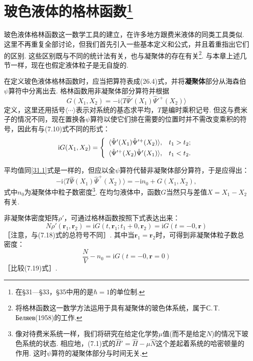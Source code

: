 \section[玻色液体的格林函数]{玻色液体的格林函数\footnote{在§31—§33，§35中用的是$\hbar=1$的单位制.}}

玻色液体格林函数这一数学工具的建立，在许多地方跟费米液体的同类工具类似. 这里不再重复全部讨论，但我们首先引入一些基本定义和公式，并且着重指出它们的区别. 这些区别既与不同的统计法有关，也与凝聚体的存在有关\footnote{将格林函数这一数学方法运用于具有凝聚体的玻色体系统，属于С.\,Т.\,Беляев(1958)的工作.}. 与本章上述几节一样，现在也假定液体粒子是无自旋的.

在定义玻色液体格林函数时，应当把算符表成(26.4)式，并将\textbf{凝聚体}部分从海森伯$\psi$算符中分离出去. 格林函数用非凝聚体部分算符并根据
\begin{equation}
G(X_{1},X_{2})=-\mathrm{i}\langle T\hat{\Psi}'(X_{1})\hat{\Psi}'^{+}(X_{2})\rangle
\label{31.1}
\end{equation}
定义，这里还用括号$\langle\cdots\rangle$表示对系统的基态求平均，$T$是编时乘积记号. 但这与费米子的情况不同，现在置换各$\psi$算符以使它们排在需要的位置时并不需改变乘积的符号，因此有与(7.10)式不同的形式：
\begin{equation}
\mathrm{i}G(X_{1},X_{2})=
\left\{\begin{array}{l l}
\langle\hat{\Psi}'(X_{1})\hat{\Psi}'^{+}(X_{2})\rangle, & t_{1}>t_{2};\\[0.3em]
\langle\hat{\Psi}'^{+}(X_{2})\hat{\Psi}'(X_{1})\rangle, & t_{1}<t_{2}.
\end{array}\right.
\label{31.2}
\end{equation}

平均值同\eqref{31.1}式是一样的，但应以全$\psi$算符代替非凝聚体部分算符，于是应得出：
\begin{equation}
-\mathrm{i}\langle T\hat{\Psi}(X_{1})\hat{\Psi}^{+}(X_{2})\rangle
=-\mathrm{i}n_{0}+G(X_{1},X_{2}),
\label{31.3}
\end{equation}
式中$n_{0}$为凝聚体中粒子数密度\footnote{像对待费米系统一样，我们将研究在给定化学势$\mu$值(而不是给定$N$)的情况下玻色系统的状态. 相应地，(7.1)式的$\hat{H}'=\hat{H}-\mu\hat{N}$这个差起着系统的哈密顿量的作用. 这时$\psi$算符的凝聚体部分与时间无关.}. 在均匀液体中，函数$G$当然只与差值$X=X_{1}-X_{2}$有关.

非凝聚体密度矩阵$\rho'$，可通过格林函数按照下式表达出来：
\begin{equation}
N\rho'(\bm{r}_{1},\bm{r}_{2})
=\mathrm{i}G(t,\bm{r}_{1};t_{1}+0,\bm{r}_{2})
=\mathrm{i}G(t=-0,\bm{r})
\label{31.4}
\end{equation}
［注意，与(7.18)式的总符号不同］. 其中当$\bm{r}_{1}=\bm{r}_{2}$时，可得到非凝聚体粒子数总密度：
\begin{equation}
\frac{N}{V}-n_{0}=\mathrm{i}G(t=-0,\bm{r}=0)
\label{31.5}
\end{equation}
［比较(7.19)式］.

